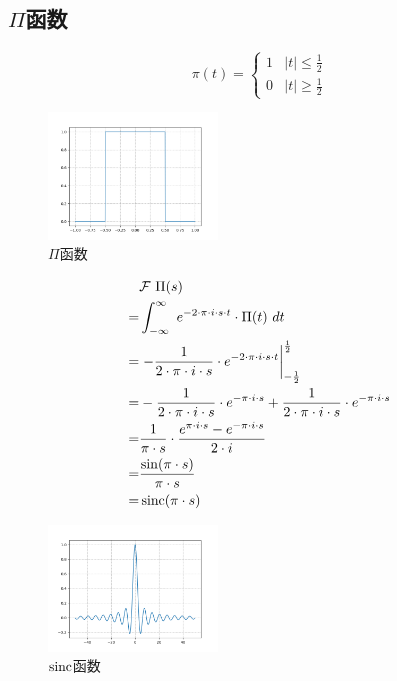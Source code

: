 \subsection{$\Pi$函数}
$$
	\pi(t)=
	\begin{cases}
		1 & |t|\leq\frac{1}{2} \\
		0 & |t|\geq\frac{1}{2}
	\end{cases}
$$
\begin{figure}[H]
	\centering
	\includegraphics[width=0.4\textwidth]{assets/Figure_3.png}
	\caption{$\Pi$函数}
\end{figure}
\begin{align*}
	  & \mathcal{F}\ \Pi(s)                                                                                                            \\
	= & \int_{-\infty}^{\infty}\ e^{-2\cdot \pi\cdot i\cdot s\cdot t}\cdot \Pi(t)\ dt                                                  \\
	= & \rsx{-\frac{1}{2\cdot\pi\cdot i\cdot s}\cdot e^{-2\cdot \pi\cdot i\cdot s\cdot t}}_{-\frac{1}{2}}^{\frac{1}{2}}                \\
	= & -\frac{1}{2\cdot\pi\cdot i\cdot s}\cdot e^{- \pi\cdot i\cdot s}+\frac{1}{2\cdot\pi\cdot i\cdot s}\cdot e^{- \pi\cdot i\cdot s} \\
	= & \frac{1}{\pi\cdot s}\cdot \frac{e^{\pi\cdot i\cdot s}-e^{- \pi\cdot i\cdot s}}{2\cdot i}                                       \\
	= & \frac{\sin(\pi\cdot s)}{\pi\cdot s}                                                                                            \\
	= & \sinc(\pi\cdot s)
\end{align*}
\begin{figure}[H]
	\centering
	\includegraphics[width=0.4\textwidth]{assets/Figure_2.png}
	\caption{$\operatorname{sinc}$函数}
\end{figure}
